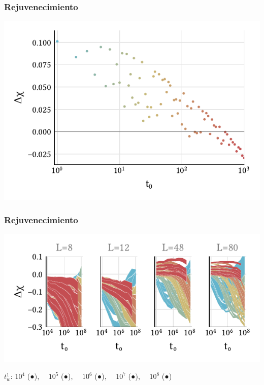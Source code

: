 \documentclass{beamer}
\begin{document}
\begin{frame}
  \frametitle{Rejuvenecimiento}
  \begin{center}
    \includegraphics{../study_cases/vanishingrejuvenation/trej_B_beamer.pdf}
  \end{center}
\end{frame}

\begin{frame}
  \frametitle{Rejuvenecimiento}
  \begin{center}
    \includegraphics[width=\textwidth]{../study_cases/trejanalysis/nonaveraged_forbeamer.pdf}
  \end{center}
  \Large $t_w^1$: \quad
  $10^4$ (\textcolor{tw1_1e4}{●}), \ \
  $10^5$ (\textcolor{tw1_1e5}{●}), \ \
  $10^6$ (\textcolor{tw1_1e6}{●}), \ \
  $10^7$ (\textcolor{tw1_1e7}{●}), \ \
  $10^8$ (\textcolor{tw1_1e8}{●})
\end{frame}
\end{document}
